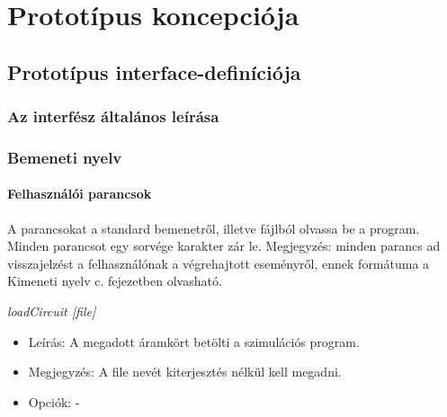 %
\chapter{Prototípus koncepciója}

\parindent 0pt
\setcounter{secnumdepth}{3}
\setcounter{tocdepth}{3}
\thispagestyle{fancy}

\section{Prototípus interface-definíciója}

\subsection{Az interfész általános leírása}

\subsection{Bemeneti nyelv}

\subsubsection{Felhasználói parancsok}

A parancsokat a standard bemenetről, illetve fájlból olvassa be a program. Minden parancsot egy sorvége karakter zár le.\newline
Megjegyzés: minden parancs ad visszajelzést a felhasználónak a végrehajtott eseményről, ennek formátuma a Kimeneti nyelv c. fejezetben olvasható.\newline

\textit{loadCircuit [file]}
\begin{itemize}
	\item Leírás: A megadott áramkört betölti a szimulációs program.
	\item Megjegyzés: A file nevét kiterjesztés nélkül kell megadni.
	\item Opciók: -
\end{itemize}

